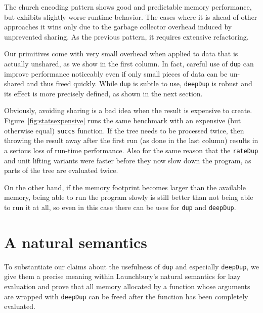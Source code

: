 \documentclass[preprint]{sigplanconf}
\theoremstyle{nonumberplain}
\newcommand{\li}{\lstinline[style=Haskell]}
\begin{document}
The church encoding pattern shows good and predictable memory performance, but exhibits slightly worse runtime behavior. The cases where it is ahead of other approaches it wins only due to the garbage collector overhead induced by unprevented sharing. As the previous pattern, it requires extensive refactoring.

Our primitives come with very small overhead when applied to data that is actually unshared, as we show in the first column. In fact, careful use of \li-dup- can improve performance noticeably even if only small pieces of data can be un-shared and thus freed quickly. While \li-dup- is subtle to use, \li-deepDup- is robust and its effect is more precisely defined, as shown in the next section.

Obviously, avoiding sharing is a bad idea when the result is expensive to create. Figure~\ref{fig:statsexpensive} runs the same benchmark with an expensive (but otherwise equal) \li-succs- function. If the tree needs to be processed twice, then throwing the result away after the first run (as done in the last column) results in a serious loss of run-time performance. Also for the same reason that the \li-rateDup- and unit lifting variants were faster before they now slow down the program, as parts of the tree are evaluated twice.

On the other hand, if the memory footprint becomes larger than the available memory, being able to run the program slowly is still better than not being able to run it at all, so even in this case there can be uses for \li-dup- and \li-deepDup-.

\pagebreak[3]
\section{A natural semantics}
\label{sec:semantics}

To substantiate our claims about the usefulness of \li-dup- and especially \li-deepDup-, we give them a precise meaning within Launchbury’s natural semantics for lazy evaluation \citep{launchbury} and prove that all memory allocated by a function whose arguments are wrapped with \li-deepDup- can be freed after the function has been completely evaluated.
\end{document}
